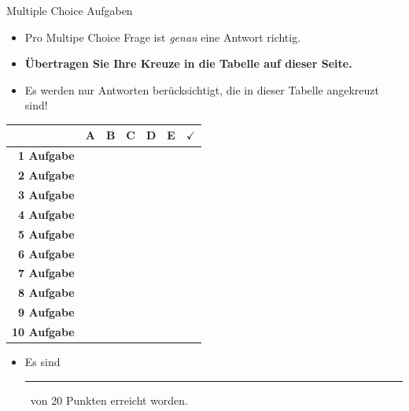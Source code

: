 \documentclass[a4paper, 9pt]{scrartcl}\usepackage[]{graphicx}\usepackage[]{xcolor}
\begin{document}
\begin{graybox}{Multiple Choice Aufgaben}
  \begin{itemize}
  \item Pro Multipe Choice Frage ist \emph{genau} eine Antwort richtig.
  \item \textbf{Übertragen Sie Ihre Kreuze in die Tabelle auf
      dieser Seite.}
  \item Es werden nur Antworten berücksichtigt, die in dieser Tabelle
    angekreuzt sind!
  \end{itemize}

\begin{center}
  \large
  \begin{tabular}{|r|c|c|c|c|c||c|}
    \hline
    & \textbf{A} & \textbf{B} & \textbf{C} & \textbf{D} & \textbf{E} & $\boldsymbol{\checkmark}$\strut\\
    \hline
    \textbf{1 Aufgabe} &   &   &   &   &   & \strut\\
    \hline
    \textbf{2 Aufgabe} &   &   &   &   &   & \strut\\
    \hline
    \textbf{3 Aufgabe} &   &   &   &   &   & \strut\\
    \hline
    \textbf{4 Aufgabe} &   &   &   &   &   & \strut\\
    \hline
    \textbf{5 Aufgabe} &   &   &   &   &   & \strut\\
    \hline
    \textbf{6 Aufgabe} &   &   &   &   &   & \strut\\
    \hline
    \textbf{7 Aufgabe} &   &   &   &   &   & \strut\\
    \hline
    \textbf{8 Aufgabe} &   &   &   &   &   & \strut\\
    \hline
    \textbf{9 Aufgabe} &   &   &   &   &   & \strut\\
    \hline
    \textbf{10 Aufgabe} &   &   &   &   &   & \strut\\
    \hline
  \end{tabular}
\end{center}

\begin{itemize}
\item Es sind \rule[0ex]{2em}{.4pt}\, von 20 Punkten erreicht worden.
\end{itemize}
\end{graybox}

\vfill
\end{document}
